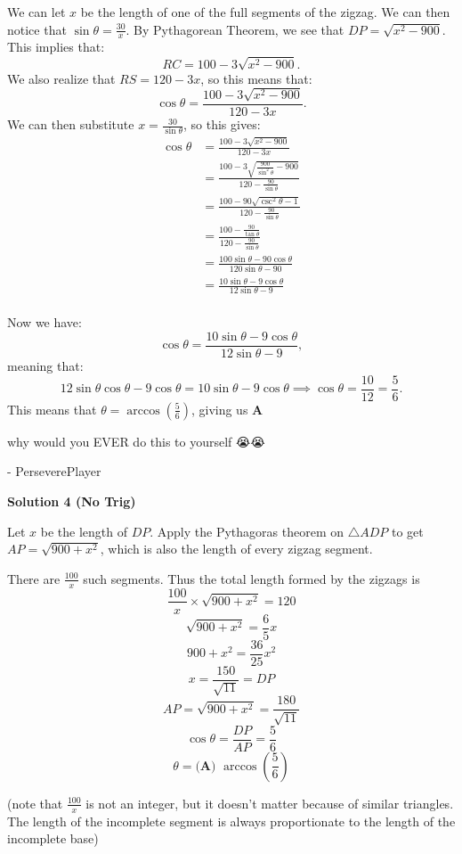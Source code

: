 \begin{enumerate}
We can let $x$ be the length of one of the full segments of the zigzag. We can then notice that $\sin\theta = \frac{30}{x}$. By Pythagorean Theorem, we see that $DP = \sqrt{x^2 - 900}$. This implies that: 
 \[RC = 100 - 3\sqrt{x^2 - 900}.\] We also realize that $RS = 120 - 3x$, so this means that: 
 \[\cos\theta = \frac{100 - 3\sqrt{x^2 - 900}}{120 - 3x}.\] We can then substitute $x = \frac{30}{\sin\theta}$, so this gives:
 \begin{align*} \cos\theta &= \frac{100 - 3\sqrt{x^2 - 900}}{120 - 3x}\\ &= \frac{100 - 3\sqrt{\frac{900}{\sin^2\theta} - 900}}{120 - \frac{90}{\sin\theta}}\\ &= \frac{100 - 90\sqrt{\csc^2\theta - 1}}{120 - \frac{90}{\sin\theta}}\\ &= \frac{100 - \frac{90}{\tan\theta}}{120 - \frac{90}{\sin\theta}}\\ &= \frac{100\sin\theta - 90\cos\theta}{120\sin\theta - 90}\\ &= \frac{10\sin\theta - 9\cos\theta}{12\sin\theta - 9}\\ \end{align*}


 Now we have: 
 \[\cos\theta = \frac{10\sin\theta - 9\cos\theta}{12\sin\theta - 9},\] meaning that: 
 \[12\sin\theta\cos\theta - 9\cos\theta = 10\sin\theta - 9\cos\theta \implies \cos\theta = \frac{10}{12} = \frac56.\]This means that $\theta = \arccos\left(\frac56\right)$, giving us $\boxed{\textbf{A}}$

 why would you EVER do this to yourself 😭😭

 - PerseverePlayer

 



\textbf{Solution 4 (No Trig)}

Let $x$ be the length of $DP$. Apply the Pythagoras theorem on $\triangle{ADP}$ to get $AP = \sqrt{900 + x^2}$, which is also the length of every zigzag segment. 

 There are $\frac{100}{x}$ such segments. Thus the total length formed by the zigzags is 
 \[\frac{100}{x} \times \sqrt{900+x^2} = 120\]
 \[\sqrt{900+x^2} = \frac{6}{5}x\]
 \[900 + x^2 = \frac{36}{25}x^2\]
 \[x = \frac{150}{\sqrt{11}} = DP\]
 \[AP = \sqrt{900 + x^2} = \frac{180}{\sqrt{11}}\]
 \[\cos\theta = \frac{DP}{AP} = \frac{5}{6}\]
 \[\theta=\boxed{\textbf{(A) } \arccos\left(\frac{5}{6}\right)}\]

 (note that $\frac{100}{x}$ is not an integer, but it doesn't matter because of similar triangles. The length of the incomplete segment is always proportionate to the length of the incomplete base)


\end{enumerate}
